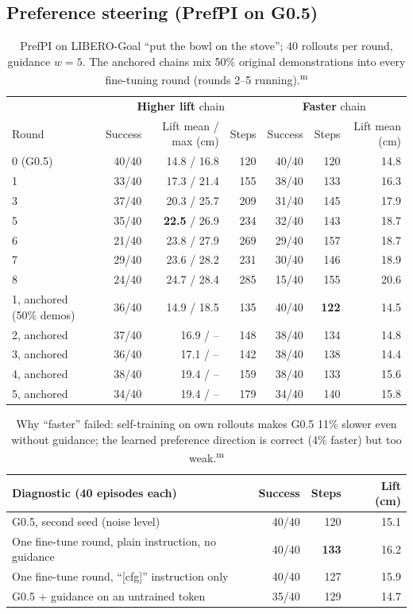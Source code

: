 \documentclass[10pt,a4paper]{article}
\DeclareRobustCommand{\meas}{\textsuperscript{\textcolor{green!50!black}{m}}}
\begin{document}
\subsection{Preference steering (PrefPI on G0.5)}
\label{sec:res-pref}
\begin{table}[H]\centering\small
\begin{tabular}{lrrr|rrr}
\toprule
& \multicolumn{3}{c|}{\textbf{Higher lift} chain} & \multicolumn{3}{c}{\textbf{Faster} chain} \\
Round & Success & Lift mean / max (cm) & Steps & Success & Steps & Lift mean (cm) \\
\midrule
0 (G0.5) & 40/40 & 14.8 / 16.8 & 120 & 40/40 & 120 & 14.8 \\
1 & 33/40 & 17.3 / 21.4 & 155 & 38/40 & 133 & 16.3 \\
3 & 37/40 & 20.3 / 25.7 & 209 & 31/40 & 145 & 17.9 \\
5 & 35/40 & \textbf{22.5} / 26.9 & 234 & 32/40 & 143 & 18.7 \\
6 & 21/40 & 23.8 / 27.9 & 269 & 29/40 & 157 & 18.7 \\
7 & 29/40 & 23.6 / 28.2 & 231 & 30/40 & 146 & 18.9 \\
8 & 24/40 & 24.7 / 28.4 & 285 & 15/40 & 155 & 20.6 \\
\midrule
1, anchored (50\% demos) & 36/40 & 14.9 / 18.5 & 135 & 40/40 & \textbf{122} & 14.5 \\
2, anchored & 37/40 & 16.9 / -- & 148 & 38/40 & 134 & 14.8 \\
3, anchored & 36/40 & 17.1 / -- & 142 & 38/40 & 138 & 14.4 \\
4, anchored & 38/40 & 19.4 / -- & 159 & 38/40 & 133 & 15.6 \\
5, anchored & 34/40 & 19.4 / -- & 179 & 34/40 & 140 & 15.8 \\
\bottomrule
\end{tabular}
\caption{PrefPI on LIBERO-Goal ``put the bowl on the stove''; 40 rollouts per round, guidance $w=5$. The anchored chains mix 50\% original demonstrations into every fine-tuning round (rounds 2--5 running).\meas}
\end{table}
\begin{table}[H]\centering\small
\begin{tabular}{lrrr}
\toprule
Diagnostic (40 episodes each) & Success & Steps & Lift (cm) \\
\midrule
G0.5, second seed (noise level) & 40/40 & 120 & 15.1 \\
One fine-tune round, plain instruction, no guidance & 40/40 & \textbf{133} & 16.2 \\
One fine-tune round, ``[cfg]'' instruction only & 40/40 & 127 & 15.9 \\
G0.5 + guidance on an untrained token & 35/40 & 129 & 14.7 \\
\bottomrule
\end{tabular}
\caption{Why ``faster'' failed: self-training on own rollouts makes G0.5 11\% slower even without guidance; the learned preference direction is correct (4\% faster) but too weak.\meas}
\end{table}
\end{document}
